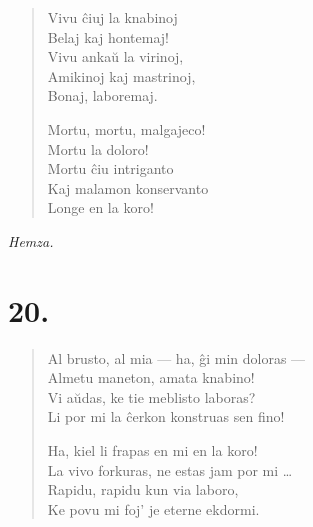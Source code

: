 \documentclass[ngerman,12pt,twoside]{book}
\begin{document}
\begin{verse}
\pstars

\begin{patverse} \vin \vin
Vivu ĉiuj la knabinoj\\
Belaj kaj hontemaj!\\
Vivu ankaŭ la virinoj,\\
Amikinoj kaj mastrinoj,\\
Bonaj, laboremaj.
\end{patverse}

\pstars

\begin{patverse} \vin \vin
Mortu, mortu, malgajeco!\\
Mortu la doloro!\\
Mortu ĉiu intriganto\\
Kaj malamon konservanto\\
Longe en la koro!
\end{patverse}

\end{verse}

\begin{flushright}
\it Hemza. 
\end{flushright}

\begin{center}
\end{center}


\section*{20.}

{\centering{}\par}

\begin{verse}
Al brusto, al mia --- ha, ĝi min doloras --- \\
  \vin   Almetu maneton, amata knabino!\\
Vi aŭdas, ke tie meblisto laboras?\\
  \vin   Li por mi la ĉerkon konstruas sen fino!

\pstars

Ha, kiel li frapas en mi en la koro!\\
\vin     La vivo forkuras, ne estas jam por mi \ldots{}\\
Rapidu, rapidu kun via laboro,\\
  \vin   Ke povu mi foj' je eterne ekdormi.
\end{verse}
\end{document}
